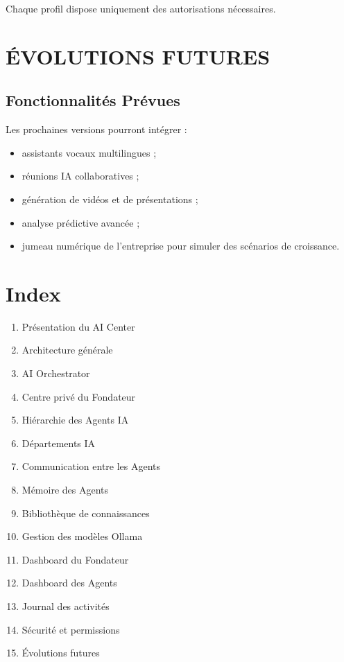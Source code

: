 \documentclass[12pt,a4paper,oneside]{book}
\begin{document}
Chaque profil dispose uniquement des autorisations nécessaires.

\chapter{ÉVOLUTIONS FUTURES}

\section{Fonctionnalités Prévues}
Les prochaines versions pourront intégrer :
\begin{itemize}
\item assistants vocaux multilingues ;
\item réunions IA collaboratives ;
\item génération de vidéos et de présentations ;
\item analyse prédictive avancée ;
\item jumeau numérique de l'entreprise pour simuler des scénarios de croissance.
\end{itemize}

\appendix

\chapter{Index}
\begin{enumerate}
\item Présentation du AI Center
\item Architecture générale
\item AI Orchestrator
\item Centre privé du Fondateur
\item Hiérarchie des Agents IA
\item Départements IA
\item Communication entre les Agents
\item Mémoire des Agents
\item Bibliothèque de connaissances
\item Gestion des modèles Ollama
\item Dashboard du Fondateur
\item Dashboard des Agents
\item Journal des activités
\item Sécurité et permissions
\item Évolutions futures
\end{enumerate}
\end{document}
